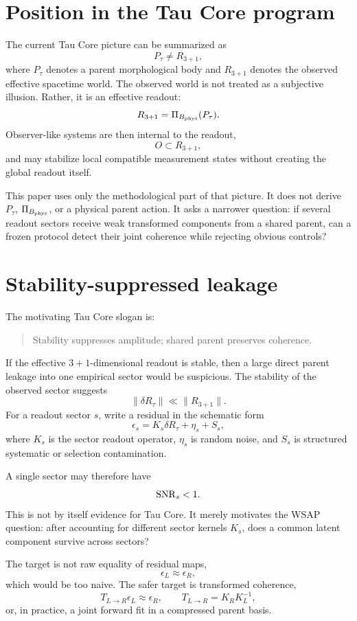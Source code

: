 \documentclass[12pt]{article}
\begin{document}
\section{Position in the Tau Core program}

The current Tau Core picture can be summarized as
\[
  P_{\tau} \neq R_{3+1},
\]
where \(P_{\tau}\) denotes a parent morphological body and \(R_{3+1}\) denotes
the observed effective spacetime world.  The observed world is not treated as a
subjective illusion.  Rather, it is an effective readout:
\[
  R_{3+1} = \Pi_{B_{\rm phys}}(P_{\tau}).
\]
Observer-like systems are then internal to the readout,
\[
  O \subset R_{3+1},
\]
and may stabilize local compatible measurement states without creating the
global readout itself.

This paper uses only the methodological part of that picture.  It does not
derive \(P_{\tau}\), \(\Pi_{B_{\rm phys}}\), or a physical parent action.  It
asks a narrower question: if several readout sectors receive weak transformed
components from a shared parent, can a frozen protocol detect their joint
coherence while rejecting obvious controls?

\section{Stability-suppressed leakage}

The motivating Tau Core slogan is:
\begin{quote}
Stability suppresses amplitude; shared parent preserves coherence.
\end{quote}

If the effective \(3+1\)-dimensional readout is stable, then a large direct
parent leakage into one empirical sector would be suspicious.  The stability of
the observed sector suggests
\[
  \|\delta R_{\tau}\| \ll \|R_{3+1}\|.
\]
For a readout sector \(s\), write a residual in the schematic form
\[
  \epsilon_s = K_s \delta R_{\tau} + \eta_s + S_s,
  \label{eq:sector-residual}
\]
where \(K_s\) is the sector readout operator, \(\eta_s\) is random noise, and
\(S_s\) is structured systematic or selection contamination.

A single sector may therefore have
\[
  {\rm SNR}_s < 1.
\]
This is not by itself evidence for Tau Core.  It merely motivates the WSAP
question: after accounting for different sector kernels \(K_s\), does a common
latent component survive across sectors?

The target is not raw equality of residual maps,
\[
  \epsilon_L \approx \epsilon_R,
\]
which would be too naive.  The safer target is transformed coherence,
\[
  T_{L\to R}\epsilon_L \approx \epsilon_R,
  \qquad
  T_{L\to R}=K_R K_L^{-1},
\]
or, in practice, a joint forward fit in a compressed parent basis.
\end{document}
